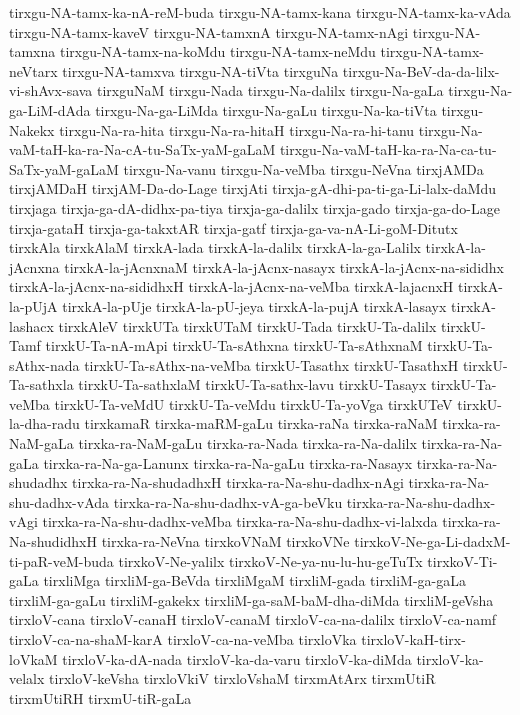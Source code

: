 {tirxgu-NA-tamx-ka-nA-reM-buda
tirxgu-NA-tamx-kana
tirxgu-NA-tamx-ka-vAda
tirxgu-NA-tamx-kaveV
tirxgu-NA-tamxnA
tirxgu-NA-tamx-nAgi
tirxgu-NA-tamxna
tirxgu-NA-tamx-na-koMdu
tirxgu-NA-tamx-neMdu
tirxgu-NA-tamx-neVtarx
tirxgu-NA-tamxva
tirxgu-NA-tiVta
tirxguNa
tirxgu-Na-BeV-da-da-lilx-vi-shAvx-sava
tirxguNaM
tirxgu-Nada
tirxgu-Na-dalilx
tirxgu-Na-gaLa
tirxgu-Na-ga-LiM-dAda
tirxgu-Na-ga-LiMda
tirxgu-Na-gaLu
tirxgu-Na-ka-tiVta
tirxgu-Nakekx
tirxgu-Na-ra-hita
tirxgu-Na-ra-hitaH
tirxgu-Na-ra-hi-tanu
tirxgu-Na-vaM-taH-ka-ra-Na-cA-tu-SaTx-yaM-gaLaM
tirxgu-Na-vaM-taH-ka-ra-Na-ca-tu-SaTx-yaM-gaLaM
tirxgu-Na-vanu
tirxgu-Na-veMba
tirxgu-NeVna
tirxjAMDa
tirxjAMDaH
tirxjAM-Da-do-Lage
tirxjAti
tirxja-gA-dhi-pa-ti-ga-Li-lalx-daMdu
tirxjaga
tirxja-ga-dA-didhx-pa-tiya
tirxja-ga-dalilx
tirxja-gado
tirxja-ga-do-Lage
tirxja-gataH
tirxja-ga-takxtAR
tirxja-gatf
tirxja-ga-va-nA-Li-goM-Ditutx
tirxkAla
tirxkAlaM
tirxkA-lada
tirxkA-la-dalilx
tirxkA-la-ga-Lalilx
tirxkA-la-jAcnxna
tirxkA-la-jAcnxnaM
tirxkA-la-jAcnx-nasayx
tirxkA-la-jAcnx-na-sididhx
tirxkA-la-jAcnx-na-sididhxH
tirxkA-la-jAcnx-na-veMba
tirxkA-lajacnxH
tirxkA-la-pUjA
tirxkA-la-pUje
tirxkA-la-pU-jeya
tirxkA-la-pujA
tirxkA-lasayx
tirxkA-lashacx
tirxkAleV
tirxkUTa
tirxkUTaM
tirxkU-Tada
tirxkU-Ta-dalilx
tirxkU-Tamf
tirxkU-Ta-nA-mApi
tirxkU-Ta-sAthxna
tirxkU-Ta-sAthxnaM
tirxkU-Ta-sAthx-nada
tirxkU-Ta-sAthx-na-veMba
tirxkU-Tasathx
tirxkU-TasathxH
tirxkU-Ta-sathxla
tirxkU-Ta-sathxlaM
tirxkU-Ta-sathx-lavu
tirxkU-Tasayx
tirxkU-Ta-veMba
tirxkU-Ta-veMdU
tirxkU-Ta-veMdu
tirxkU-Ta-yoVga
tirxkUTeV
tirxkU-la-dha-radu
tirxkamaR
tirxka-maRM-gaLu
tirxka-raNa
tirxka-raNaM
tirxka-ra-NaM-gaLa
tirxka-ra-NaM-gaLu
tirxka-ra-Nada
tirxka-ra-Na-dalilx
tirxka-ra-Na-gaLa
tirxka-ra-Na-ga-Lanunx
tirxka-ra-Na-gaLu
tirxka-ra-Nasayx
tirxka-ra-Na-shudadhx
tirxka-ra-Na-shudadhxH
tirxka-ra-Na-shu-dadhx-nAgi
tirxka-ra-Na-shu-dadhx-vAda
tirxka-ra-Na-shu-dadhx-vA-ga-beVku
tirxka-ra-Na-shu-dadhx-vAgi
tirxka-ra-Na-shu-dadhx-veMba
tirxka-ra-Na-shu-dadhx-vi-lalxda
tirxka-ra-Na-shudidhxH
tirxka-ra-NeVna
tirxkoVNaM
tirxkoVNe
tirxkoV-Ne-ga-Li-dadxM-ti-paR-veM-buda
tirxkoV-Ne-yalilx
tirxkoV-Ne-ya-nu-lu-hu-geTuTx
tirxkoV-Ti-gaLa
tirxliMga
tirxliM-ga-BeVda
tirxliMgaM
tirxliM-gada
tirxliM-ga-gaLa
tirxliM-ga-gaLu
tirxliM-gakekx
tirxliM-ga-saM-baM-dha-diMda
tirxliM-geVsha
tirxloV-cana
tirxloV-canaH
tirxloV-canaM
tirxloV-ca-na-dalilx
tirxloV-ca-namf
tirxloV-ca-na-shaM-karA
tirxloV-ca-na-veMba
tirxloVka
tirxloV-kaH-tirx-loVkaM
tirxloV-ka-dA-nada
tirxloV-ka-da-varu
tirxloV-ka-diMda
tirxloV-ka-velalx
tirxloV-keVsha
tirxloVkiV
tirxloVshaM
tirxmAtArx
tirxmUtiR
tirxmUtiRH
tirxmU-tiR-gaLa
}
